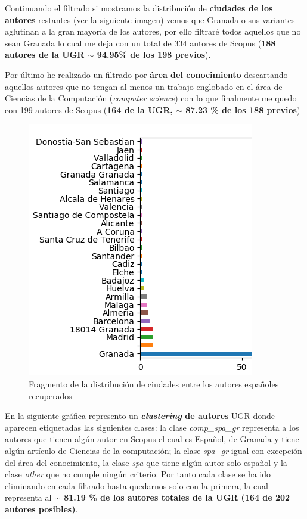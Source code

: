 Continuando el filtrado si mostramos la distribución de \textbf{ciudades de los autores} restantes (ver la siguiente imagen) vemos que Granada o sus variantes aglutinan a la gran mayoría de los autores, por ello filtraré todos aquellos que no sean Granada lo cual me deja con un total de 334 autores de Scopus (\textbf{188 autores de la \acrshort{UGR} $\sim$ 94.95\% de los 198 previos}).

Por último he realizado un filtrado por \textbf{área del conocimiento} descartando aquellos autores que no tengan al menos un trabajo englobado en el área de Ciencias de la Computación (\textit{computer science}) con lo que finalmente me quedo con 199 autores de Scopus (\textbf{164 de la \acrshort{UGR}, $\sim$ 87.23 \% de los 188 previos})

\begin{figure}[h]
	
	\centering
	\includegraphics[width=0.5775\linewidth]{imagenes/city_hist}
	\caption{Fragmento de la distribución de ciudades entre los autores españoles recuperados}
\end{figure}
\newpage

En la siguiente gráfica represento un \textbf{\textit{clustering} de autores} \acrshort{UGR} donde aparecen etiquetadas las siguientes clases: la clase \textit{comp\_spa\_gr} representa a los autores que tienen algún autor en Scopus el cual es Español, de Granada y tiene algún artículo de Ciencias de la computación; la clase \textit{spa\_gr} igual con excepción del área del conocimiento, la clase \textit{spa} que tiene algún autor solo español y la clase \textit{other} que no cumple ningún criterio. Por tanto cada clase se ha ido eliminando en cada filtrado hasta quedarnos solo con la primera, la cual representa al \textbf{$\sim$ 81.19 \% de los autores totales de la \acrshort{UGR} (164 de 202 autores posibles)}.

